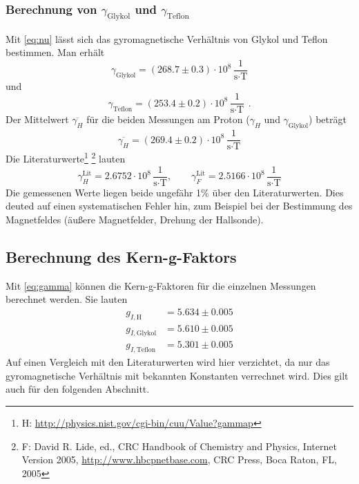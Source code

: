 \subsubsection{Berechnung von $\gamma_\text{Glykol}$ und $\gamma_\text{Teflon}$}
Mit \autoref{eq:nu} lässt sich das gyromagnetische Verhältnis von Glykol und Teflon bestimmen.
Man erhält
\begin{equation}
  \gamma_{\text{Glykol}} = (268.7 \pm 0.3) \cdot 10^8\,\frac{1}{\text{s} \cdot \text{T}}
\end{equation}
und
\begin{equation}
  \gamma_{\text{Teflon}} = (253.4 \pm 0.2) \cdot 10^8\,\frac{1}{\text{s} \cdot \text{T}} \ \, .
\end{equation}
Der Mittelwert $\overline{\gamma_H}$ für die beiden Messungen am Proton ($\gamma_{H}$ und $\gamma_{\text{Glykol}}$) beträgt
\begin{equation}
  \overline{\gamma_H} = (269.4 \pm 0.2) \cdot 10^8\,\frac{1}{\text{s} \cdot \text{T}}
\end{equation}
Die Literaturwerte\footnote{H: \url{http://physics.nist.gov/cgi-bin/cuu/Value?gammap}} 
\footnote{F: David R. Lide, ed., CRC Handbook of Chemistry
and Physics, Internet Version 2005, \url{http://www.hbcpnetbase.com}, CRC Press, Boca Raton, FL, 2005} lauten
\begin{equation}
  \gamma_H^\text{Lit} = 2.6752 \cdot 10^8 \,\frac{1}{\text{s} \cdot \text{T}}, \qquad 
  \gamma_F^\text{Lit} = 2.5166 \cdot 10^8 \,\frac{1}{\text{s} \cdot \text{T}}
\end{equation}
Die gemessenen Werte liegen beide ungefähr 1\% über den Literaturwerten. Dies deuted auf einen systematischen Fehler hin, zum Beispiel bei der 
Bestimmung des Magnetfeldes (äußere Magnetfelder, Drehung der Hallsonde).

\subsection{Berechnung des Kern-g-Faktors}
Mit \autoref{eq:gamma} können die Kern-g-Faktoren für die einzelnen Messungen berechnet werden.
Sie lauten
\begin{equation}
\begin{split}
g_{I,\text{H}}&= 5.634	\pm 0.005\\
g_{I,\text{Glykol}}&= 5.610	\pm 0.005\\
g_{I,\text{Teflon}}&= 5.301 \pm	0.005
\end{split}
\end{equation}
Auf einen Vergleich mit den Literaturwerten wird hier verzichtet, da nur das gyromagnetische Verhältnis mit bekannten Konstanten verrechnet wird. 
Dies gilt auch für den folgenden Abschnitt.


